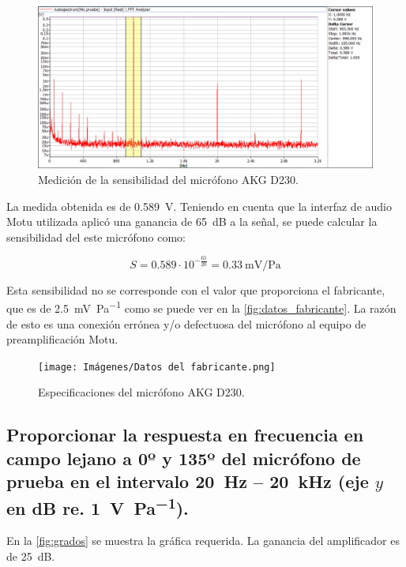 \documentclass[10pt]{article}
\begin{document}
\begin{figure}[hbtp]
  \centering
  \includegraphics[width=\linewidth]{Imágenes/2. Sensibilidad del micrófono D230.png}
  \caption{Medición de la sensibilidad del micrófono AKG D230.}
  \label{fig:Sensibilidad_D230}
\end{figure}

La medida obtenida es de \qty{0.589}{\volt }. Teniendo en cuenta que la interfaz de audio Motu utilizada aplicó una ganancia de \qty{65}{\dB} a la señal, se puede calcular la sensibilidad del este micrófono como:

\begin{equation} \label{eq:Sensibilidad_D230}
  S = \num{0.589} \cdot 10^{-\frac{65}{20} } = \qty{0.33}{\milli \volt \per \pascal }
\end{equation}

Esta sensibilidad no se corresponde con el valor que proporciona el fabricante, que es de \qty{2.5}{\milli \volt \per \pascal } como se puede ver en la \autoref{fig:datos_fabricante}. La razón de esto es una conexión errónea y/o defectuosa del micrófono al equipo de preamplificación Motu.

\begin{figure}[hbtp]
  \centering
  \texttt{[image: Imágenes/Datos del fabricante.png]}
  \caption{Especificaciones del micrófono AKG D230.}
  \label{fig:datos_fabricante}
\end{figure}


\subsection{Proporcionar la respuesta en frecuencia en campo lejano a 0º y 135º del micrófono de prueba en el intervalo \qty{20}{\hertz } – \qty{20}{\kilo\hertz } (eje $y$ en dB re. \qty{1}{\volt\per\pascal}).}

En la \autoref{fig:grados} se muestra la gráfica requerida. La ganancia del amplificador es de \qty{25}{\dB}.
\end{document}
